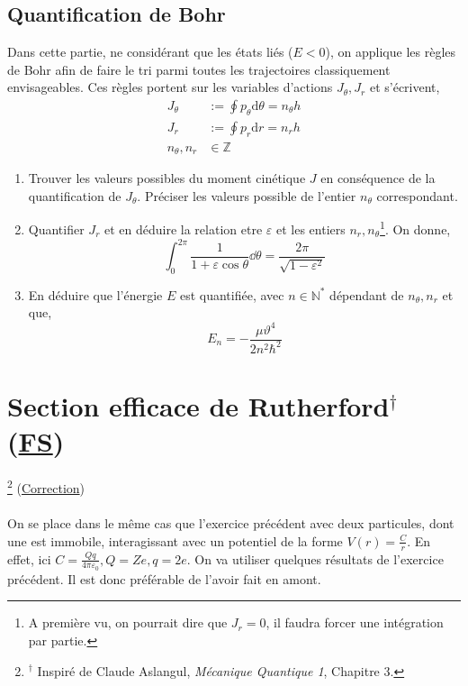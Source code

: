 \documentclass[a4paper,10pt]{report}
\begin{document}
	\subsection{Quantification de Bohr}
	Dans cette partie, ne considérant que les états liés ($E <0$), on applique les règles de Bohr afin de faire le tri parmi toutes les trajectoires classiquement envisageables. Ces règles portent sur les variables d'actions $J_\theta, J_r$ et s'écrivent,
	 \begin{align*}
J_\theta &:= \oint p_\theta \text{d}\theta = n_\theta h\\
J_r &:= \oint p_r \text{d}r = n_r h\\
n_\theta, n_r &\in \mathbb{Z}
	 \end{align*}
	 
	 \begin{enumerate}
	 	\item Trouver les valeurs possibles du moment cinétique $J$ en conséquence de la quantification de $J_\theta$. Préciser les valeurs possible de l'entier $n_\theta$ correspondant.
	 	\item Quantifier $J_r$ et en déduire la relation etre $\varepsilon$ et les entiers $n_r, n_\theta$\footnote{A première vu, on pourrait dire que $J_r =0$, il faudra forcer une intégration par partie.}.
	 	On donne,
	 	$$\int_0^{2\pi} \frac 1 {1 + \varepsilon \cos\theta} \dd\theta = \frac{2\pi}{\sqrt{1-\varepsilon^2}}$$
	 	\item En déduire que l'énergie $E$ est quantifiée, avec $n \in \mathbb{N}^*$ dépendant de $n_\theta, n_r$ et que,
	 	$$E_n = - \frac{\mu \vartheta^4}{2n^2\hbar^2}$$
	 	
	 \end{enumerate}
\newpage
	\section[Section efficace de Rutherford]{Section efficace de Rutherford$^\dag$ (\hyperref[subsubsec:subatomique]{FS})\space \faStar\faStar}\footnote{$^\dag$ Inspiré de Claude Aslangul, \textit{Mécanique Quantique 1}, Chapitre 3.}\label{subsec:Rutherford}
	(\hyperref[subsec:correctionRutherford]{Correction})\\\\
On se place dans le même cas que l'exercice précédent avec deux particules, dont une est immobile, interagissant avec un potentiel de la forme $V(r) = \frac {C} r$. En effet, ici $C = \frac {Qq}{4\pi\varepsilon_0}, Q = Ze, q = 2e$.
On va utiliser quelques résultats de l'exercice précédent. Il est donc préférable de l'avoir fait en amont. 
\end{document}
